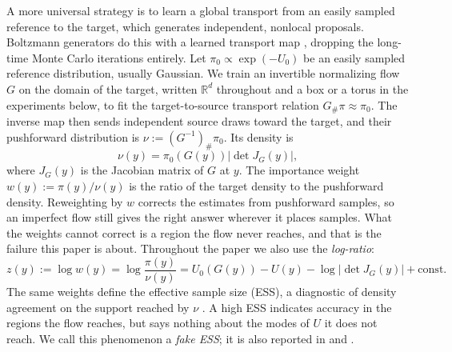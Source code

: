 \documentclass{article}
\begin{document}
A more universal strategy is to learn a global transport from an easily sampled reference to the target, which generates independent, nonlocal proposals. Boltzmann generators do this with a learned transport map \citep{noe2019boltzmann}, dropping the long-time Monte Carlo iterations entirely. Let $\pi_0\propto\exp(-U_0)$ be an easily sampled reference distribution, usually Gaussian. We train an invertible normalizing flow $G$ \citep{rezende2015variational,papamakarios2017masked,kingma2018glow} on the domain of the target, written $\mathbb R^d$ throughout and a box or a torus in the experiments below, to fit the target-to-source transport relation $G_{\#}\pi\approx\pi_0$. The inverse map then sends independent source draws toward the target, and their pushforward distribution is $\nu:=(G^{-1})_{\#}\pi_0$. Its density is
\begin{equation}
    \nu(y)=\pi_0(G(y))\left|\det J_G(y)\right|,
    \label{eq: pushforward-density}
\end{equation}
where $J_G(y)$ is the Jacobian matrix of $G$ at $y$. The importance weight $w(y):=\pi(y)/\nu(y)$ is the ratio of the target density to the pushforward density. Reweighting by $w$ corrects the estimates from pushforward samples, so an imperfect flow still gives the right answer wherever it places samples. What the weights cannot correct is a region the flow never reaches, and that is the failure this paper is about. Throughout the paper we also use the \emph{log-ratio}:
\begin{equation}
	z(y) := \log w(y) = \log \frac{\pi(y)}{\nu(y)} =  U_0(G(y)) - U(y) - \log|\det J_G(y)| + \mathrm{const}.
	\label{eq: log-ratio}
\end{equation}
The same weights define the effective sample size (ESS), a diagnostic of density agreement on the support reached by $\nu$ \citep{liu2001monte,doucet2001introduction,martino2017rethinking}. A high ESS indicates accuracy in the regions the flow reaches, but says nothing about the modes of $U$ it does not reach. We call this phenomenon a \emph{fake ESS}; it is also reported in \citet{noe2019boltzmann} and \citet{midgley2022flow}.
\end{document}
